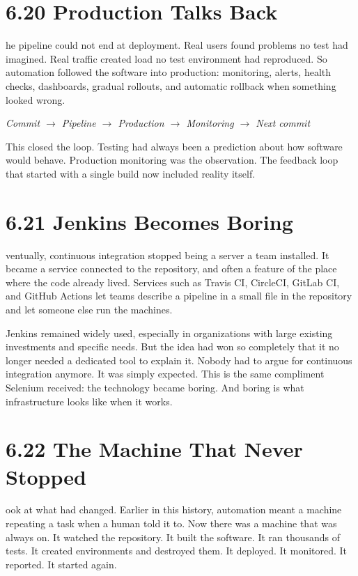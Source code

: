\documentclass[11pt, a4paper, openany]{book}
\newcommand{\initialcap}[1]{{\fontfamily{lmss}\selectfont\huge\textbf{#1}}}
\begin{document}
\section{6.20 Production Talks Back}
\noindent \initialcap{T}he pipeline could not end at deployment. Real users found problems no test had imagined. Real traffic created load no test environment had reproduced. So automation followed the software into production: monitoring, alerts, health checks, dashboards, gradual rollouts, and automatic rollback when something looked wrong.
\begin{center}
\textit{Commit $\rightarrow$ Pipeline $\rightarrow$ Production $\rightarrow$ Monitoring $\rightarrow$ Next commit}
\end{center}
This closed the loop. Testing had always been a prediction about how software would behave. Production monitoring was the observation. The feedback loop that started with a single build now included reality itself.

\section{6.21 Jenkins Becomes Boring}
\noindent \initialcap{E}ventually, continuous integration stopped being a server a team installed. It became a service connected to the repository, and often a feature of the place where the code already lived. Services such as Travis CI, CircleCI, GitLab CI, and GitHub Actions let teams describe a pipeline in a small file in the repository and let someone else run the machines.

\noindent Jenkins remained widely used, especially in organizations with large existing investments and specific needs. But the idea had won so completely that it no longer needed a dedicated tool to explain it. Nobody had to argue for continuous integration anymore. It was simply expected. This is the same compliment Selenium received: the technology became boring. And boring is what infrastructure looks like when it works.

\section{6.22 The Machine That Never Stopped}
\noindent \initialcap{L}ook at what had changed. Earlier in this history, automation meant a machine repeating a task when a human told it to. Now there was a machine that was always on. It watched the repository. It built the software. It ran thousands of tests. It created environments and destroyed them. It deployed. It monitored. It reported. It started again.
\end{document}
